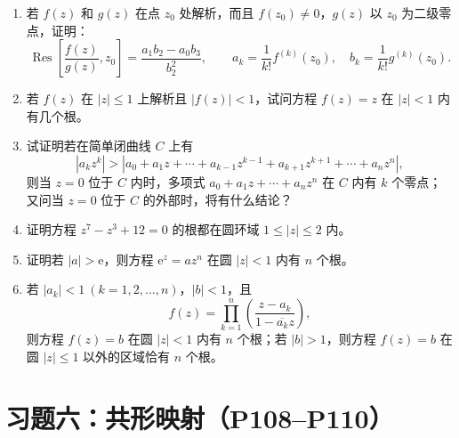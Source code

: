 \documentclass[UTF8,11pt,a4paper]{ctexart}
\newcommand{\ee}{\mathrm{e}}
\newcommand{\Res}{\operatorname{Res}}
\begin{document}
\begin{enumerate}
\item 若 $f(z)$ 和 $g(z)$ 在点 $z_0$ 处解析，而且 $f(z_0)\ne0$，$g(z)$ 以 $z_0$ 为二级零点，证明：
\[
\Res\left[\frac{f(z)}{g(z)},z_0\right]
=\frac{a_1b_2-a_0b_3}{b_2^2},
\qquad a_k=\frac1{k!}f^{(k)}(z_0),\quad b_k=\frac1{k!}g^{(k)}(z_0).
\]

\item 若 $f(z)$ 在 $|z|\leqslant1$ 上解析且 $|f(z)|<1$，试问方程 $f(z)=z$ 在 $|z|<1$ 内有几个根。

\item 试证明若在简单闭曲线 $C$ 上有
\[
|a_kz^k|>|a_0+a_1z+\cdots+a_{k-1}z^{k-1}+a_{k+1}z^{k+1}+\cdots+a_nz^n|,
\]
则当 $z=0$ 位于 $C$ 内时，多项式 $a_0+a_1z+\cdots+a_nz^n$ 在 $C$ 内有 $k$ 个零点；又问当 $z=0$ 位于 $C$ 的外部时，将有什么结论？

\item 证明方程 $z^7-z^3+12=0$ 的根都在圆环域 $1\leqslant|z|\leqslant2$ 内。

\item 证明若 $|a|>\ee$，则方程 $\ee^z=az^n$ 在圆 $|z|<1$ 内有 $n$ 个根。

\item 若 $|a_k|<1\ (k=1,2,\ldots,n)$，$|b|<1$，且
\[
f(z)=\prod_{k=1}^{n}\left(\frac{z-a_k}{1-\overline{a_k}z}\right),
\]
则方程 $f(z)=b$ 在圆 $|z|<1$ 内有 $n$ 个根；若 $|b|>1$，则方程 $f(z)=b$ 在圆 $|z|\leqslant1$ 以外的区域恰有 $n$ 个根。
\end{enumerate}

\newpage
\section{习题六：共形映射（P108--P110）}
\end{document}
